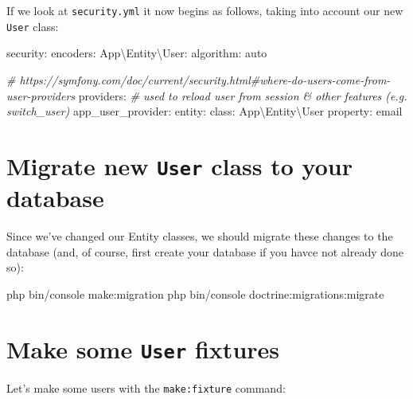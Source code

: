 \documentclass[a4paperpaper,openright]{book}
\newenvironment{Shaded}{}{}
\newcommand{\AttributeTok}[1]{\textcolor[rgb]{0.49,0.56,0.16}{#1}}
\newcommand{\CommentTok}[1]{\textcolor[rgb]{0.38,0.63,0.69}{\textit{#1}}}
\newcommand{\ExtensionTok}[1]{#1}
\newcommand{\FunctionTok}[1]{\textcolor[rgb]{0.02,0.16,0.49}{#1}}
\newcommand{\NormalTok}[1]{#1}
\begin{document}
If we look at \texttt{security.yml} it now begins as follows, taking
into account our new \texttt{User} class:

\begin{Shaded}
\begin{Highlighting}[]
    \FunctionTok{security:}
        \FunctionTok{encoders:}
            \FunctionTok{App\textbackslash{}Entity\textbackslash{}User:}
                \FunctionTok{algorithm:}\AttributeTok{ auto}
    
        \CommentTok{# https://symfony.com/doc/current/security.html#where-do-users-come-from-user-providers}
        \FunctionTok{providers:}
            \CommentTok{# used to reload user from session & other features (e.g. switch_user)}
            \FunctionTok{app_user_provider:}
                \FunctionTok{entity:}
                    \FunctionTok{class:}\AttributeTok{ App\textbackslash{}Entity\textbackslash{}User}
                    \FunctionTok{property:}\AttributeTok{ email}
\end{Highlighting}
\end{Shaded}

\hypertarget{migrate-new-user-class-to-your-database}{%
\section{\texorpdfstring{Migrate new \texttt{User} class to your
database}{Migrate new User class to your database}}\label{migrate-new-user-class-to-your-database}}

Since we've changed our Entity classes, we should migrate these changes
to the database (and, of course, first create your database if you havce
not already done so):

\begin{Shaded}
\begin{Highlighting}[]
    \ExtensionTok{php}\NormalTok{ bin/console make:migration}
    \ExtensionTok{php}\NormalTok{ bin/console doctrine:migrations:migrate}
\end{Highlighting}
\end{Shaded}

\hypertarget{make-some-user-fixtures}{%
\section{\texorpdfstring{Make some \texttt{User}
fixtures}{Make some User fixtures}}\label{make-some-user-fixtures}}

Let's make some users with the \texttt{make:fixture} command:
\end{document}
